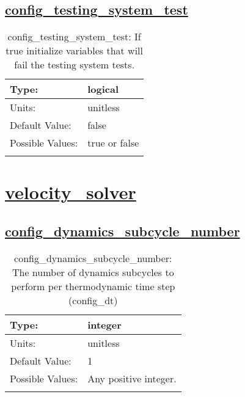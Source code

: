 \subsection[config\_testing\_system\_test]{\hyperref[sec:nm_tab_unit_test]{config\_testing\_system\_test}}
\label{subsec:nm_sec_config_testing_system_test}
\begin{center}
\begin{longtable}{| p{2.0in} || p{4.0in} |}
    \hline
    Type: & logical \\
    \hline
    Units: & \si{unitless} \\
    \hline
    Default Value: & false \\
    \hline
    Possible Values: & true or false \\
    \hline
    \caption{config\_testing\_system\_test: If true initialize variables that will fail the testing system tests.}
\end{longtable}
\end{center}
\section[velocity\_solver]{\hyperref[sec:nm_tab_velocity_solver]{velocity\_solver}}
\label{sec:nm_sec_velocity_solver}
\subsection[config\_dynamics\_subcycle\_number]{\hyperref[sec:nm_tab_velocity_solver]{config\_dynamics\_subcycle\_number}}
\label{subsec:nm_sec_config_dynamics_subcycle_number}
\begin{center}
\begin{longtable}{| p{2.0in} || p{4.0in} |}
    \hline
    Type: & integer \\
    \hline
    Units: & \si{unitless} \\
    \hline
    Default Value: & 1 \\
    \hline
    Possible Values: & Any positive integer. \\
    \hline
    \caption{config\_dynamics\_subcycle\_number: The number of dynamics subcycles to perform per thermodynamic time step (config\_dt)}
\end{longtable}
\end{center}
